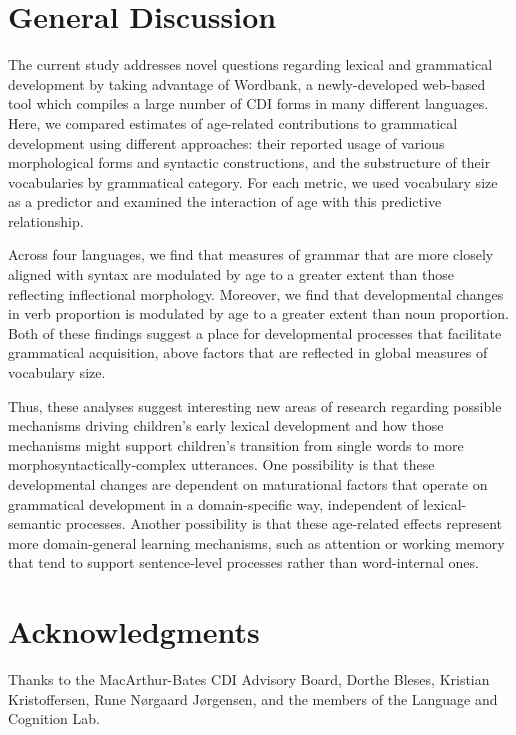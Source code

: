 \documentclass[10pt,letterpaper]{article}
\begin{document}
\section{General Discussion}

The current study addresses novel questions regarding lexical and grammatical development by taking advantage of Wordbank, a newly-developed web-based tool which compiles a large number of CDI forms in many different languages.  Here, we compared estimates of age-related contributions to grammatical development using different approaches: their reported usage of various morphological forms and syntactic constructions, and the substructure of their vocabularies by grammatical category. For each metric, we used vocabulary size as a predictor and examined the interaction of age with this predictive relationship.

Across four languages, we find that measures of grammar that are more closely aligned with syntax are modulated by age to a greater extent than those reflecting inflectional morphology.  Moreover, we find that  developmental changes in verb proportion is modulated by age to a greater extent than noun proportion. Both of these findings suggest a place for developmental processes that facilitate grammatical acquisition, above factors that are reflected in global measures of vocabulary size.

Thus, these analyses suggest interesting new areas of research regarding possible mechanisms driving children's early lexical development and how those mechanisms might support children's transition from single words to more morphosyntactically-complex utterances.  One possibility is that these developmental changes are dependent on maturational factors that operate on grammatical development in a domain-specific way, independent of lexical-semantic processes.  Another possibility is that these age-related effects represent more domain-general learning mechanisms, such as attention or working memory that tend to support sentence-level processes rather than word-internal ones.


\section{Acknowledgments}

Thanks to the MacArthur-Bates CDI Advisory Board, Dorthe Bleses, Kristian Kristoffersen, Rune N\o rgaard J\o rgensen, and the members of the Language and Cognition Lab. 



\setlength{\bibleftmargin}{.125in}
\setlength{\bibindent}{-\bibleftmargin}


\end{document}
